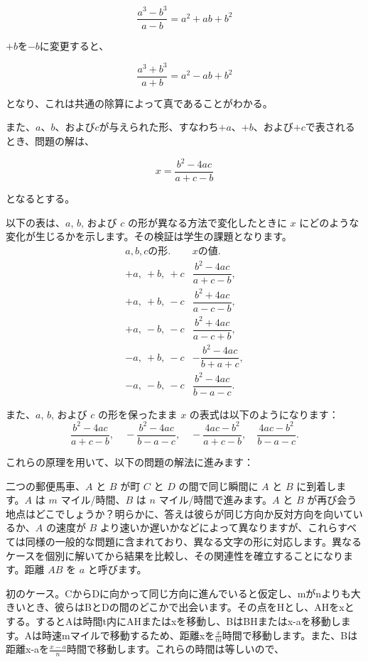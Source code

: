 \documentclass[a4paper,11pt,openany]{ltjsbook}
\newcommand{\TEntry}[2][]{#2}
\newcommand{\Add}[1]{#1}
\newcommand{\Figure}[2][]{}
\newcommand{\Pagelabel}[1]{\phantomsection\label{page:#1}}
\begin{document}
\[
\frac{a^{3} - b^{3}}{a - b} = a^{2} + ab + b^{2}
\]

$+b$を$-b$に変更すると、

\[
\frac{a^{3} + b^{3}}{a + b} = a^{2} - ab + b^{2}
\]

となり、これは共通の除算によって真であることがわかる。

また、$a$、$b$、および$c$が与えられた形、すなわち$+a$、$+b$、および$+c$で表されるとき、問題の解は、

\[
x = \frac{b^{2} - 4ac}{a + c - b}
\]

となるとする。

以下の表は、$a$, $b$, および $c$ の形が異なる方法で変化したときに $x$ にどのような変化が生じるかを示します。その検証は学生の課題となります。
\[
\begin{array}{cr}
\TEntry{a, b, c の形.} &
\TEntry{x の値.} \\
+a,\ +b,\ +c &  \dfrac{b^{2} - 4ac}{a + c - b}\Add{,} \\
+a,\ +b,\ -c &  \dfrac{b^{2} + 4ac}{a - c - b}\Add{,} \\
+a,\ -b,\ -c &  \dfrac{b^{2} + 4ac}{a - c + b}\Add{,} \\
-a,\ +b,\ -c & -\dfrac{b^{2} - 4ac}{b + a + c}\Add{,} \\
-a,\ -b,\ -c &  \dfrac{b^{2} - 4ac}{b - a - c}.
\end{array}
\]

また、$a$, $b$, および $c$ の形を保ったまま $x$ の表式は以下のようになります：
\[
 \frac{b^{2} - 4ac}{a + c - b},\quad
-\frac{b^{2} - 4ac}{b - a - c},\quad
-\frac{4ac - b^{2}}{a + c - b},\quad
 \frac{4ac - b^{2}}{b - a - c}.
\]

これらの原理を用いて、以下の問題の解法に進みます：
\Pagelabel{112}


\Figure[nolabel]{112}

二つの郵便馬車、$A$ と $B$ が町 $C$ と $D$ の間で同じ瞬間に $A$ と $B$ に到着します。$A$ は $m$ マイル/時間、$B$ は $n$ マイル/時間で進みます。$A$ と $B$ が再び会う地点はどこでしょうか？明らかに、答えは彼らが同じ方向か反対方向を向いているか、$A$ の速度が $B$ より速いか遅いかなどによって異なりますが、これらすべては同様の一般的な問題に含まれており、異なる文字の形に対応します。異なるケースを個別に解いてから結果を比較し、その関連性を確立することになります。距離 $AB$ を $a$ と呼びます。

初のケース。CからDに向かって同じ方向に進んでいると仮定し、mがnよりも大きいとき、彼らはBとDの間のどこかで出会います。その点をHとし、AHをxとする。するとAは時間t内にAHまたはxを移動し、BはBHまたはx-aを移動します。Aは時速mマイルで移動するため、距離xを\(\frac{x}{m}\)時間で移動します。また、Bは距離x-aを\(\frac{x - a}{n}\)時間で移動します。これらの時間は等しいので、
\end{document}
